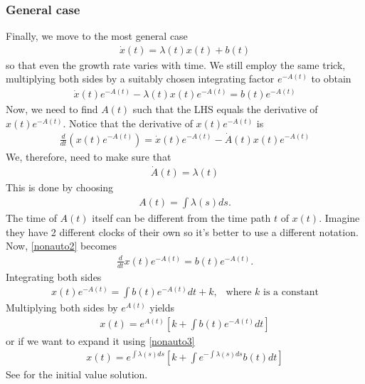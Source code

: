 \documentclass[11pt,a4paper]{book}
\theoremstyle{definition}\newtheorem{definition}{Definition}
\theoremstyle{definition}\newtheorem{fact}{Fact}
\theoremstyle{definition}\newtheorem{remark}{Remark}
\theoremstyle{definition}\newtheorem{ex}{Ex.}
\theoremstyle{definition}\newtheorem{project}{Project}
\theoremstyle{definition}\newtheorem{problem}{Problem}
\theoremstyle{definition}\newtheorem{example}{Example}
\numberwithin{theorem}{section}
\numberwithin{corollary}{chapter}
\numberwithin{assumption}{chapter}
\numberwithin{definition}{chapter}
\numberwithin{prop}{chapter}
\numberwithin{notation}{chapter}
\numberwithin{problem}{chapter}
\numberwithin{example}{chapter}
\numberwithin{fact}{chapter}
\numberwithin{ex}{chapter}
\begin{document}
	\subsubsection{General case}
	Finally, we move to the most general case
	\begin{align*}
		\dot{x}(t) = \lambda (t) x(t) + b(t)
	\end{align*}
	so that even the growth rate varies with time. We still employ the same trick, multiplying both sides by a suitably chosen integrating factor $e^{- A(t)}$ to obtain
	\begin{align}
		\dot{x}(t) e^{- A(t)} - \lambda (t) x (t) e^{-A(t)} = b(t) e^{-A(t)} \label{nonauto2}
	\end{align}
	Now, we need to find $A(t)$ such that the LHS equals the derivative of $x(t) e^{-A(t)}$. Notice that the derivative of $x(t) e^{-A(t)}$ is
	\begin{align*}
		\frac{d}{dt} (x(t) e^{-A(t)}) = \dot{x}(t) e^{-A(t)} - \dot{A}(t)x(t)  e^{-A(t)}
	\end{align*}
	We, therefore, need to make sure that
	\begin{align*}
		 \dot{A}(t) = \lambda (t)
	\end{align*}
	This is done by choosing
	\begin{align} 
		A(t) = \int \lambda (s) ds. \label{nonauto3}
	\end{align}
	The time of $A(t)$ itself can be different from the time path $t$ of $x(t)$. Imagine they have 2 different clocks of their own so it's better to use a different notation. 
	Now, \eqref{nonauto2} becomes
	\begin{align*}
		\frac{d}{dt} x(t) e^{-A(t)} = b(t) e^{-A(t)}.
	\end{align*}
	Integrating both sides 
	\begin{align*}
		x(t) e^{-A(t)} = \int b(t) e^{-A(t)} dt + k, \ \ \text{ where $k$ is a constant}
	\end{align*}
	Multiplying both sides by $e^{A(t)}$ yields
	\begin{align*}
		x(t) = e^{A(t)} \left[ k + \int b(t) e^{-A(t)} dt \right]
	\end{align*}
	or if we want to expand it using \eqref{nonauto3}
	\begin{align*}
		x(t) = e^{\int \lambda (s) ds} \left[ k + \int e^{-\int \lambda (s) ds} b(t) dt \right]
	\end{align*}
	See \citet[p. 204]{sydsaeter2008further} for the initial value solution.
	
\end{document}
